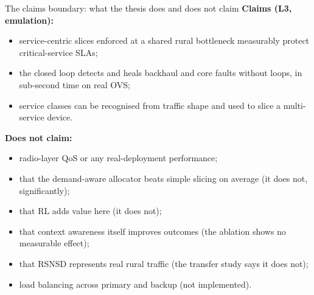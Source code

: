 \documentclass[10pt,a4paper]{article}
\begin{document}
\begin{warnbox}{The claims boundary: what the thesis does and does not claim}
\textbf{Claims (L3, emulation):}
\begin{itemize}
\item service-centric slices enforced at a shared rural bottleneck measurably protect critical-service SLAs;
\item the closed loop detects and heals backhaul and core faults without loops, in sub-second time on real OVS;
\item service classes can be recognised from traffic shape and used to slice a multi-service device.
\end{itemize}
\textbf{Does not claim:}
\begin{itemize}
\item radio-layer QoS or any real-deployment performance;
\item that the demand-aware allocator beats simple slicing on average (it does not, significantly);
\item that RL adds value here (it does not);
\item that context awareness itself improves outcomes (the ablation shows no measurable effect);
\item that RSNSD represents real rural traffic (the transfer study says it does not);
\item load balancing across primary and backup (not implemented).
\end{itemize}
\end{warnbox}

\tableofcontents
\clearpage


















\appendix

\end{document}
